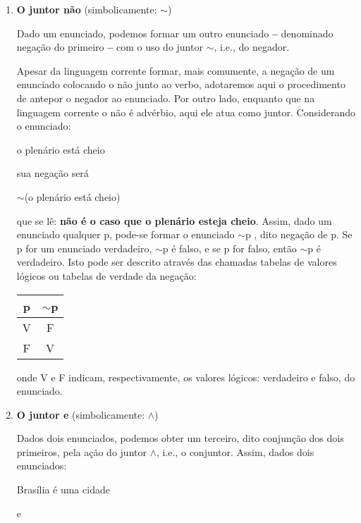 \begin{enumerate}[label=\textbf{(\arabic*)}]
    \item \textbf{O juntor não} (simbolicamente: $\sim$)

    Dado um enunciado, podemos formar um outro enunciado \textbf{--} denominado negação do primeiro \textbf{--} com o uso do juntor $\sim$, i.e., do negador.

    Apesar da linguagem corrente formar, mais comumente, a negação de um enunciado colocando o não junto ao verbo, adotaremos aqui o procedimento de antepor o negador ao enunciado.
    Por outro lado, enquanto que na linguagem corrente o não é advérbio, aqui ele atua como juntor.
    Considerando o enunciado:

    \begin{center}
        o plenário está cheio
    \end{center}
    sua negação será
    \begin{center}
        $\sim$(o plenário está cheio)
    \end{center}
    que se lê: \textbf{não é o caso que o plenário esteja cheio}.
    Assim, dado um enunciado qualquer p, pode-se formar o enunciado $\sim$p , dito negação de p.
    Se p for um enunciado verdadeiro, $\sim$p é falso, e se p for falso, então $\sim$p é verdadeiro.
    Isto pode ser descrito através das chamadas tabelas de valores lógicos ou tabelas de verdade da negação:

    \begin{center}
        \begin{tabular}{c c}
            p & $\sim$p \\ \hline
            V & F \\
            F & V
        \end{tabular}
    \end{center}

    onde V e F indicam, respectivamente, os valores lógicos: verdadeiro e falso, do enunciado.

    \item \textbf{O juntor e} (simbolicamente: $\land$)

    Dados dois enunciados, podemos obter um terceiro, dito conjunção dos dois primeiros, pela ação do juntor $\land$, i.e., o conjuntor.
    Assim, dados dois enunciados:

    \begin{center}
        Brasília é uma cidade

        e


\end{center}
\end{enumerate}
